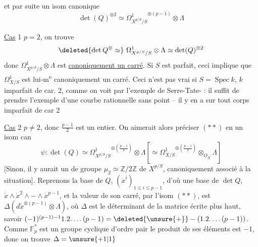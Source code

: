 et par suite un isom canonique
\[
 \det(Q)^{\otimes2}\simeq{\Omega^1_{X^{p/S}/S}}^{\otimes(p-1)}\otimes\Lambda
 \tag*{($\ast\ast$)}
\]

\uline{Cas} 1 \quad $p=2$, on trouve
\[
 \deleted{\det Q^{\otimes}\simeq}\ \Omega^1_{X^{p/S}/S}\otimes\Lambda\simeq\det(Q)^{\otimes2}
\]
donc $\Omega^1_{X^{p/S}/S}\otimes\Lambda$ est \uline{canoniquement un carré}. Si $S$ est parfait,  ceci implique que $\Omega^1_{X/S}$ est lui-m\textsuperscript{e} canoniquement un carré.    Ceci n'est pas vrai si $S=\operatorname{Spec}k$, $k$  imparfait de car. 2,  comme  on voit  par l'exemple de Serre-Tate- : il suffit de prendre l'exemple d'une courbe  rationnelle sans point --   il y en a sur tout corps imparfait de car 2

\uline{Cas} 2 \quad $p\ne2$, donc $\frac{p-1}{2}$ est un entier. On aimerait alors préciser $(\ast\ast)$ en un isom can
\[
 \psi:\det(Q)\simeq{\Omega^1_{X^{p/S}/S}}^{\otimes(\frac{p-1}{2})}\otimes\Lambda
 \left[\simeq{\Omega^1_{X/S}}^{\otimes(\frac{p-1}{2})}\otimes_{\underline O_X}\Lambda\right]
\]
[Sinon, il y aurait un  de groupe $\mu_2\simeq\mathbb Z/2\mathbb Z$ de $X^{p/S}$, canoniquement associé à la situation]. Reprenons la base de $Q$, $(\dot x^i)_{1\le i\le p-1}$,  d'où une base de  $\det Q$, $\dot x\wedge\dot x^2\wedge-\wedge\dot x^{p-1}$, et la valeur de son carré, par l'isom $(\ast\ast)$, est $\Delta(d\widetilde x^{\otimes(p-1)}\otimes\Lambda)$, où $\Delta$ est le déterminant de la matrice écrite plus haut, savoir $(-1)^{(p-1)-1}1.2.\ldots(p-1)=\deleted{\unsure{+}}-(1.2.\ldots(p-1))$. Comme $\mathbb F_p^\ast$ est un groupe cyclique d'ordre  pair  le produit de ses éléments est $-1$, donc on trouve $\Delta=\unsure{+1|1}$
